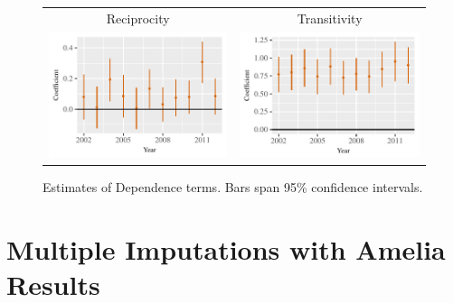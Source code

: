 \documentclass[reqno,onecolumn,letterpaper,12pt]{article}
\begin{document}
{\begin{figure}[!h]
\centering
\begin{tabular}{c@{\hskip 0cm}c}
Reciprocity & Transitivity \\
\includegraphics[height=.2\textheight, clip=true, trim=0cm 0cm 0cm .2cm]{draft_figures/rl_plots25/Mutuality.pdf}    &
\includegraphics[height=.2\textheight, clip=true, trim=0cm 0cm 0cm .2cm]{draft_figures/rl_plots25/Transitivity.pdf}
\end{tabular}
\caption{\label{fig:q25netterms} Estimates of Dependence terms. Bars span 95\% confidence intervals. }
\end{figure}








\section{Multiple Imputations with Amelia Results}\label{ameliaresults}

}
\end{document}
